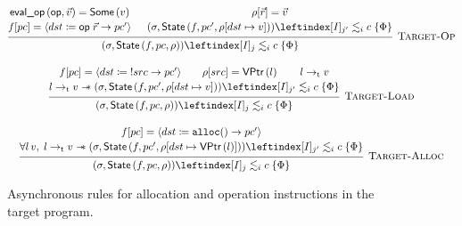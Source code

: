\documentclass[report.tex]{subfiles}
\begin{document}
\begin{figure}[htp]
  \centering
  \begin{gather*}
    \begin{prooftree}
      \hypo{
        \begin{matrix}
          \evalop{\textsf{op}}{\vec{v}} = \Some{v}
          \\[.2em]
          \pcatis{f}{pc}{\Iop{dst}{\textsf{op}}{\vec{r}}{pc'}}
        \end{matrix}
      }
      \hypo{
        \begin{matrix}
          \getreg{\vec{r}}{\rho} = \vec{v}
          \\[.2em]
          \fsim{(\sigma, \State{f}{pc'}{\setreg{dst}{v}{\rho}})}
          {j'}{i}{c}{\Phi}
        \end{matrix}
      }
      \infer2[\textsc{Target-Op}]{
        \fsim{(\sigma, \State{f}{pc}{\rho})}{j}{i}{c}{\Phi}
      }
    \end{prooftree}
    \\[1em]
    \begin{prooftree}
      \hypo{
        \begin{matrix}
          \pcatis{f}{pc}{\Iload{dst}{src}{pc'}}\qquad
          \getreg{src}{\rho} = \VPtr{l}\qquad
          \ptrt{l}{v}
          \\[.2em]
          \ptrt{l}{v} \wand \fsim{(\sigma, \State{f}{pc'}{\setreg{dst}{v}{\rho}})}
          {j'}{i}{c}{\Phi}
        \end{matrix}
      }
      \infer1[\textsc{Target-Load}]{
        \fsim{(\sigma, \State{f}{pc}{\rho})}{j}{i}{c}{\Phi}
      }
    \end{prooftree}
    \\[1em]
    \begin{prooftree}
      \hypo{
        \begin{matrix}
          \pcatis{f}{pc}{\Ialloc{dst}{pc'}}
          \\[.2em]
          \forall l\, v,\;
          \ptrt{l}{v} \wand
          \fsim{(\sigma, \State{f}{pc'}{\setreg{dst}{\VPtr{l}}{\rho}})}
          {j'}{i}{c}{\Phi}
        \end{matrix}
      }
      \infer1[\textsc{Target-Alloc}]{
        \fsim{(\sigma, \State{f}{pc}{\rho})}{j}{i}{c}{\Phi}
      }
    \end{prooftree}
  \end{gather*}
  \caption{
    Asynchronous rules for allocation
    and operation instructions in the target program.
  }
  \label{fig:target-rules}
\end{figure}
\end{document}
